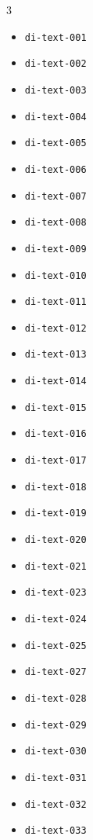 \begin{multicols}{3}
    \begin{itemize}[nosep, leftmargin=*]
        \item \texttt{di-text-001}
        \item \texttt{di-text-002}
        \item \texttt{di-text-003}
        \item \texttt{di-text-004}
        \item \texttt{di-text-005}
        \item \texttt{di-text-006}
        \item \texttt{di-text-007}
        \item \texttt{di-text-008}
        \item \texttt{di-text-009}
        \item \texttt{di-text-010}
        \item \texttt{di-text-011}
        \item \texttt{di-text-012}
        \item \texttt{di-text-013}
        \item \texttt{di-text-014}
        \item \texttt{di-text-015}
        \item \texttt{di-text-016}
        \item \texttt{di-text-017}
        \item \texttt{di-text-018}
        \item \texttt{di-text-019}
        \item \texttt{di-text-020}
        \item \texttt{di-text-021}
        \item \texttt{di-text-023}
        \item \texttt{di-text-024}
        \item \texttt{di-text-025}
        \item \texttt{di-text-027}
        \item \texttt{di-text-028}
        \item \texttt{di-text-029}
        \item \texttt{di-text-030}
        \item \texttt{di-text-031}
        \item \texttt{di-text-032}
        \item \texttt{di-text-033}

\end{itemize}
\end{multicols}

